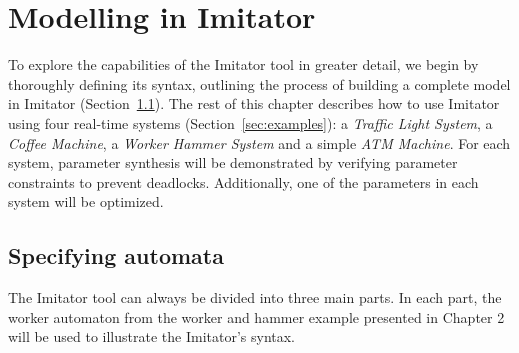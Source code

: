 
\chapter{Modelling in Imitator}


To explore the capabilities of the Imitator tool in greater detail, we begin by thoroughly defining its syntax, outlining the process of building a complete model in Imitator (Section~\ref{sec:specifying_automata}).
%
The rest of this chapter describes how to use Imitator using four real-time systems (Section~\ref{sec:examples}): a \emph{Traffic Light System}, a \emph{Coffee Machine}, a \emph{Worker Hammer System} and a simple \emph{ATM Machine}. For each system, parameter synthesis will be demonstrated by verifying parameter constraints to prevent deadlocks. Additionally, one of the parameters in each system will be optimized.

\section{Specifying automata}\label{sec:specifying_automata}

The Imitator tool can always be divided into three main parts. In each part, the worker automaton from the worker and hammer example presented in Chapter 2 will be used to illustrate the Imitator's syntax.

\newcommand{\kw}[1]{\texttt{\textbf{\textcolor{blue!80!black}{#1}}}}

